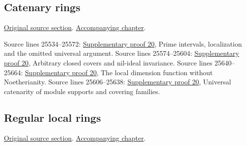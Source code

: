 \subsection{Catenary rings}
\hypertarget{algebra-source-section-catenary}{}
\noindent\href{https://github.com/stacks/stacks-project/blob/a04446e57ec1fbc252a871afcec7752fb2807b14/algebra.tex\#L25456}{Original source section}. \href{algebra.pdf\#nameddest=section-catenary}{Accompanying chapter}.

\begin{AlgebraSourceRoutes}
 Source lines 25534--25572: \hyperlink{algebra_catenary_regular_notes_20260928}{Supplementary proof 20}, Prime intervals, localization and the omitted universal argument.
 Source lines 25574--25604: \hyperlink{algebra_catenary_regular_notes_20260928}{Supplementary proof 20}, Arbitrary closed covers and nil-ideal invariance.
 Source lines 25640--25664: \hyperlink{algebra_catenary_regular_notes_20260928}{Supplementary proof 20}, The local dimension function without Noetherianity.
 Source lines 25606--25638: \hyperlink{algebra_catenary_regular_notes_20260928}{Supplementary proof 20}, Universal catenarity of module supports and covering families.
\end{AlgebraSourceRoutes}

\subsection{Regular local rings}
\hypertarget{algebra-source-section-regular}{}
\noindent\href{https://github.com/stacks/stacks-project/blob/a04446e57ec1fbc252a871afcec7752fb2807b14/algebra.tex\#L25679}{Original source section}. \href{algebra.pdf\#nameddest=section-regular}{Accompanying chapter}.


